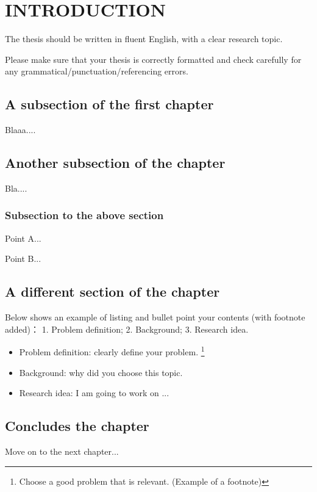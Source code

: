 
\chapter{INTRODUCTION}

The thesis should be written in fluent English, with a clear research topic.

Please make sure that your thesis is correctly formatted and check carefully for any grammatical/punctuation/referencing errors.


\section{A subsection of the first chapter}

Blaaa....



\section{Another subsection of the chapter}

Bla....



\subsection{Subsection to the above section}

Point A...

Point B...


\section{A different section of the chapter}

Below shows an example of listing and bullet point your contents (with footnote added)：
1. Problem definition;
2. Background; 
3. Research idea.
\begin{itemize}
  \item Problem definition: clearly define your problem. \footnote{Choose a good problem that is relevant. (Example of a footnote)}
  \item Background: why did you choose this topic.
  \item Research idea: I am going to work on ...
\end{itemize}



\section{Concludes the chapter}

Move on to the next chapter...

